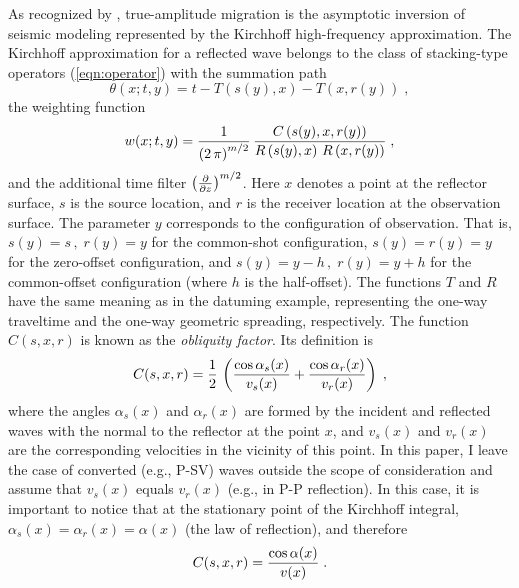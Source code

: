As recognized by \cite{tygel}, true-amplitude migration
\cite[]{tam,vor} is the asymptotic inversion of seismic modeling
represented by the Kirchhoff high-frequency approximation. The
Kirchhoff approximation for a reflected wave \cite[]{haddon,norm}
belongs to the class of stacking-type operators (\ref{eqn:operator})
with the summation path
\begin{equation}
\theta(x;t,y)  =  t - T\left(s(y),x\right) - T\left(x,r(y)\right)\;,
\label{eqn:modt}
\end{equation}
the weighting function
\begin{equation}
w(x;t,y)  =  {1\over{\left(2\,\pi\right)^{m/2}}} \,
{{C\left(s(y),x,r(y)\right)} 
\over {R\left(s(y),x\right)\,R\left(x,r(y)\right)}}\;,
\label{eqn:modw}
\end{equation}
and the additional time filter $\left({\partial \over {\partial
z}}\right)^{m/2}$. Here $x$ denotes a point at the reflector surface,
$s$ is the source location, and $r$ is the receiver location at the
observation surface. The parameter $y$ corresponds to the
configuration of observation. That is, $s(y) = s\,,\;r(y) = y$ for the
common-shot configuration, $s(y) = r(y) = y$ for the zero-offset
configuration, and $s(y) = y - h\,,\;r(y) = y + h$ for the
common-offset configuration (where $h$ is the half-offset). The
functions $T$ and $R$ have the same meaning as in the datuming example,
representing the one-way traveltime and the one-way geometric
spreading, respectively. The function $C(s,x,r)$ is known as the {\em
obliquity factor}. Its definition is
\begin{equation}
C(s,x,r) = {1 \over 2}\,
\left({{\cos{\alpha_s(x)}} \over {v_s(x)}} +
      {{\cos{\alpha_r(x)}} \over {v_r(x)}}\right)\;, 
\label{eqn:obliquity}
\end{equation}
where the angles $\alpha_s(x)$ and $\alpha_r(x)$ are formed by the
incident and reflected waves with the normal to the reflector at the
point $x$, and $v_s(x)$ and $v_r(x)$ are the corresponding velocities
in the vicinity of this point. In this paper, I leave the case of
converted (e.g., P-SV) waves outside the scope of consideration and
assume that $v_s(x)$ equals $v_r(x)$ (e.g., in P-P reflection). In this
case, it is important to notice that at the stationary point of the
Kirchhoff integral, $\alpha_s(x) = \alpha_r(x) = \alpha(x)$ (the law of
reflection), and therefore
\begin{equation}
C(s,x,r) = {{\cos{\alpha(x)}} \over {v(x)}}\;.
\label{eqn:statpoint}
\end{equation}
